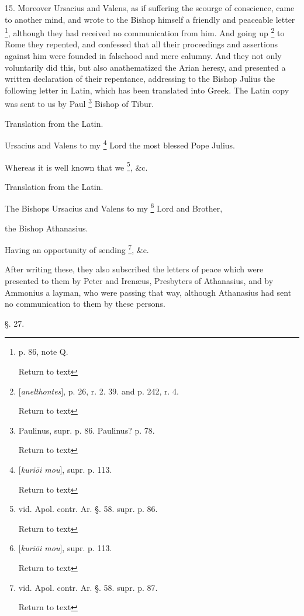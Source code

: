 15. Moreover Ursacius and Valens, as if suffering
the scourge of conscience, came to another mind, and wrote to the
Bishop himself a friendly and peaceable letter \footnote{p. 86, note Q.

Return to text}, although they had received no communication from him. And
going up \footnote{[\emph{anelthontes}], p. 26, r. 2. 39. and p. 242, r. 4.

Return to text} to Rome
they repented, and confessed that all their proceedings and assertions
against him were founded in falsehood and mere calumny. And they not
only voluntarily did this, but also anathematized the Arian heresy,
and presented a written declaration of their repentance, addressing to
the Bishop Julius the following letter in Latin, which has been
translated into Greek. The Latin copy was sent to us by Paul \footnote{Paulinus, supr. p. 86. Paulinus? p. 78.

Return to text} Bishop of Tibur.

Translation from the Latin.

Ursacius and Valens to my \footnote{[\emph{kuri\={o}i mou}], supr. p. 113.

Return to text} Lord the most blessed Pope Julius.

Whereas it is well known that we \footnote{vid. Apol. contr. Ar. §. 58. supr. p. 86.

Return to text}, \&c.

Translation from the Latin.

The Bishops Ursacius and Valens to
my \footnote{[\emph{kuri\={o}i mou}], supr. p. 113.

Return to text} Lord and Brother,

the Bishop Athanasius.

Having an opportunity of sending \footnote{vid. Apol. contr. Ar. §. 58. supr. p. 87.

Return to text}, \&c.

After writing these, they also subscribed the
letters of peace which were presented to them by Peter and Irenæus,
Presbyters of Athanasius, and by Ammonius a layman, who were passing
that way, although Athanasius had sent no communication to them by
these persons.

§. 27.

